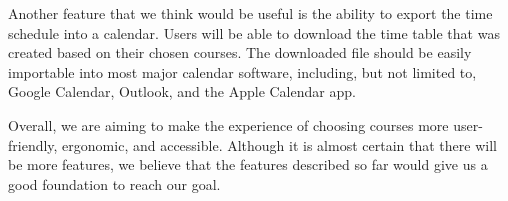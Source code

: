 \documentclass[12pt]{article}
\begin{document}
Another feature that we think would be useful is the ability to export the time schedule into a calendar. Users will be able to download the time table that was created based on their chosen courses. The downloaded file should be easily importable into most major calendar software, including, but not limited to, Google Calendar, Outlook, and the Apple Calendar app. \par
Overall, we are aiming to make the experience of choosing courses more user-friendly, ergonomic, and accessible. Although it is almost certain that there will be more features, we believe that the features described so far would give us a good foundation to reach our goal.
\end{document}
